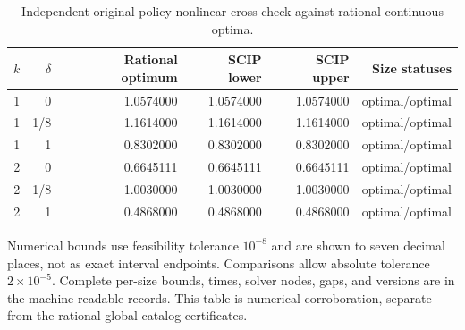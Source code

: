 \begin{table}[p]\centering\small
\caption{Independent original-policy nonlinear cross-check against rational continuous optima.}\label{tab:r43-scip}
\begin{tabular}{rrrrrr}\toprule
$k$ & $\delta$ & Rational optimum & SCIP lower & SCIP upper & Size statuses\\\midrule
1 & 0 & 1.0574000 & 1.0574000 & 1.0574000 & optimal/optimal \\
1 & 1/8 & 1.1614000 & 1.1614000 & 1.1614000 & optimal/optimal \\
1 & 1 & 0.8302000 & 0.8302000 & 0.8302000 & optimal/optimal \\
2 & 0 & 0.6645111 & 0.6645111 & 0.6645111 & optimal/optimal \\
2 & 1/8 & 1.0030000 & 1.0030000 & 1.0030000 & optimal/optimal \\
2 & 1 & 0.4868000 & 0.4868000 & 0.4868000 & optimal/optimal \\
\bottomrule\end{tabular}
\par\smallskip\begin{minipage}{\textwidth}\small
Numerical bounds use feasibility tolerance $10^{-8}$ and are shown to seven decimal places, not as exact interval endpoints. Comparisons allow absolute tolerance $2\times10^{-5}$. Complete per-size bounds, times, solver nodes, gaps, and versions are in the machine-readable records. This table is numerical corroboration, separate from the rational global catalog certificates.
\end{minipage}\end{table}
